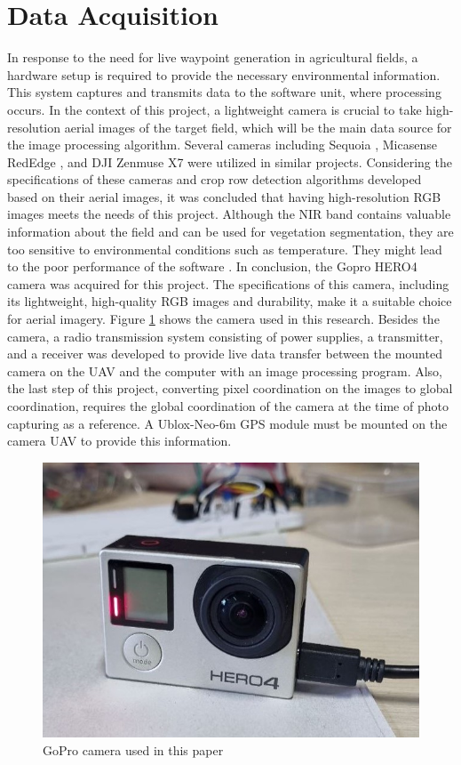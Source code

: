 \documentclass[conference]{IEEEtran}
\begin{document}
\section{Data Acquisition}\label{Data Acquisition}
In response to the need for live waypoint generation in agricultural fields, a hardware setup is required to provide the necessary environmental information. This system captures and transmits data to the software unit, where processing occurs. In the context of this project, a lightweight camera is crucial to take high-resolution aerial images of the target field, which will be the main data source for the image processing algorithm. Several cameras including Sequoia
\cite{b9,b4,b7,b6}
, Micasense RedEdge
\cite{b9,b14}, and DJI Zenmuse X7
\cite{b5} were utilized in similar projects. Considering the specifications of these cameras and crop row detection algorithms developed based on their aerial images, it was concluded that having high-resolution RGB images meets the needs of this project. Although the NIR band contains valuable information about the field and can be used for vegetation segmentation, they are too sensitive to environmental conditions such as temperature. They might lead to the poor performance of the software
\cite{b5}. In conclusion, the Gopro HERO4 camera was acquired for this project. The specifications of this camera, including its lightweight, high-quality RGB images and durability, make it a suitable choice for aerial imagery. Figure
\ref{gopro} shows the camera used in this research.
Besides the camera, a radio transmission system consisting of power supplies, a transmitter, and a receiver was developed to provide live data transfer between the mounted camera on the UAV and the computer with an image processing program.
Also, the last step of this project, converting pixel coordination on the images to global coordination, requires the global coordination of the camera at the time of photo capturing as a reference. A Ublox-Neo-6m GPS module must be mounted on the camera UAV to provide this information.

\begin{figure}[h]
\includegraphics[width=\linewidth]{GoPro.jpg}
\caption{GoPro camera used in this paper}
\label{gopro}
\end{figure}
\end{document}
